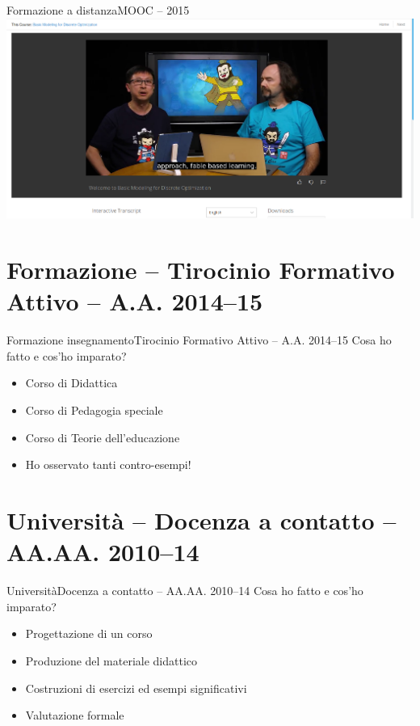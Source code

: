 \documentclass[italian]{beamer}
\begin{document}
{

}

\begin{frame}{Formazione a distanza}{MOOC -- 2015}
 \includegraphics[width=\textwidth]{img/fbl.png}
\end{frame}

\section{Formazione -- Tirocinio Formativo Attivo -- A.A. 2014--15}

\begin{frame}{Formazione insegnamento}{Tirocinio Formativo Attivo -- A.A. 2014--15}
 Cosa ho fatto e cos'ho imparato?
 \begin{itemize}
  \item Corso di Didattica
  \item Corso di Pedagogia speciale
  \item Corso di Teorie dell'educazione
  \item Ho osservato tanti contro-esempi!
 \end{itemize}
 \note{}
\end{frame}

\section{Universit\`a -- Docenza a contatto -- AA.AA. 2010--14}

\begin{frame}{Universit\`a}{Docenza a contatto -- AA.AA. 2010--14}
 Cosa ho fatto e cos'ho imparato?
 \begin{itemize}
  \item Progettazione di un corso
  \item Produzione del materiale didattico
  \item Costruzioni di esercizi ed esempi significativi
  \item Valutazione formale
 \end{itemize}
\end{frame}
\end{document}
